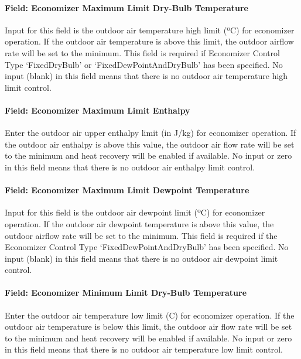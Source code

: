 \paragraph{Field: Economizer Maximum Limit Dry-Bulb Temperature}\label{field-economizer-maximum-limit-dry-bulb-temperature-2}

Input for this field is the outdoor air temperature high limit (ºC) for economizer operation. If the outdoor air temperature is above this limit, the outdoor airflow rate will be set to the minimum. This field is required if Economizer Control Type `FixedDryBulb' or `FixedDewPointAndDryBulb' has been specified. No input (blank) in this field means that there is no outdoor air temperature high limit control.

\paragraph{Field: Economizer Maximum Limit Enthalpy}\label{field-economizer-maximum-limit-enthalpy-2}

Enter the outdoor air upper enthalpy limit (in J/kg) for economizer operation. If the outdoor air enthalpy is above this value, the outdoor air flow rate will be set to the minimum and heat recovery will be enabled if available. No input or zero in this field means that there is no outdoor air enthalpy limit control.

\paragraph{Field: Economizer Maximum Limit Dewpoint Temperature}\label{field-economizer-maximum-limit-dewpoint-temperature-4}

Input for this field is the outdoor air dewpoint limit (ºC) for economizer operation. If the outdoor air dewpoint temperature is above this value, the outdoor airflow rate will be set to the minimum. This field is required if the Economizer Control Type `FixedDewPointAndDryBulb' has been specified. No input (blank) in this field means that there is no outdoor air dewpoint limit control.

\paragraph{Field: Economizer Minimum Limit Dry-Bulb Temperature}\label{field-economizer-minimum-limit-dry-bulb-temperature-2}

Enter the outdoor air temperature low limit (C) for economizer operation. If the outdoor air temperature is below this limit, the outdoor air flow rate will be set to the minimum and heat recovery will be enabled if available. No input or zero in this field means that there is no outdoor air temperature low limit control.

